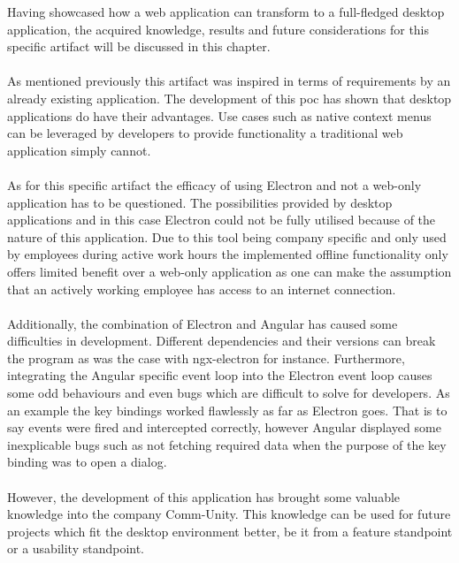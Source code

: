 
Having showcased how a web application can transform to a full-fledged desktop application, the acquired 
knowledge, results and future considerations for this specific artifact will be discussed in this chapter.\paragraph{}
As mentioned previously this artifact was inspired in terms of requirements by an already existing application. 
The development of this \acrshort{poc} has shown that desktop applications do have their advantages.
Use cases such as native context menus can be leveraged by developers to provide functionality a traditional 
web application simply cannot.\paragraph{}
As for this specific artifact the efficacy of using Electron and not a web-only application has to be questioned.
The possibilities provided by desktop applications and in this case Electron could not be fully utilised  
because of the nature of this application.
Due to this tool being company specific and only used by employees during active work hours the implemented offline 
functionality only offers limited benefit over a web-only application as one can make the assumption
that an actively working employee has access to an internet connection.\paragraph{}
Additionally, the combination of Electron and Angular has caused some difficulties in development.
Different dependencies and their versions can break the program as was the case with ngx-electron for instance.
Furthermore, integrating the Angular specific event loop into the Electron event loop causes some odd behaviours
and even bugs which are difficult to solve for developers. 
As an example the key bindings worked flawlessly as far as Electron goes.
That is to say events were fired and intercepted correctly, however Angular displayed some inexplicable bugs 
such as not fetching required data when the purpose of the key binding was to open a dialog.\paragraph{}
However, the development of this application has brought some valuable knowledge into the company Comm-Unity.
This knowledge can be used for future projects which fit the desktop environment better, be it 
from a feature standpoint or a usability standpoint.